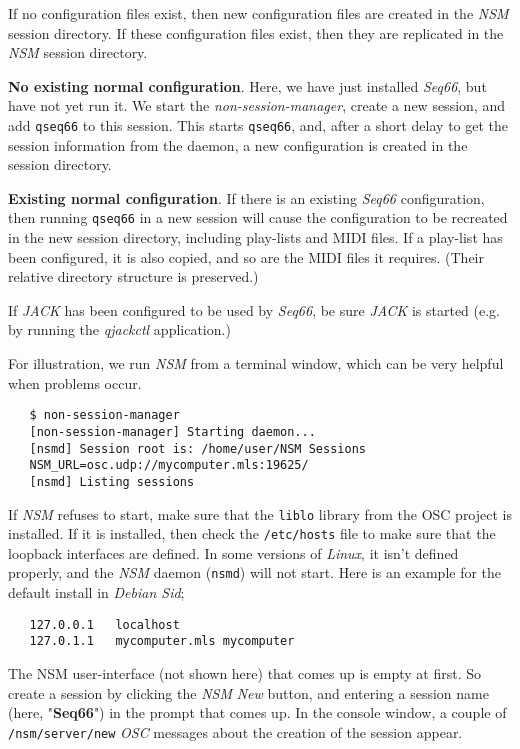    If no configuration files exist, then new configuration files are created
   in the \textsl{NSM} session directory.
   If these configuration files exist, then they are replicated in the
   \textsl{NSM} session directory.

   \textbf{No existing normal configuration}.
   Here, we have just installed \textsl{Seq66}, but have not
   yet run it.  We start the \textsl{non-session-manager}, create a new session,
   and add \texttt{qseq66} to this session.  This starts \texttt{qseq66}, and,
   after a short delay to get the session information from the daemon, a new
   configuration is created in the session directory.

   \textbf{Existing normal configuration}.
   If there is an existing \textsl{Seq66} configuration,
   then running \texttt{qseq66} in a new
   session will cause the configuration to be recreated in the new session
   directory, including play-lists and MIDI files.
   If a play-list has been configured, it is also
   copied, and so are the MIDI files it requires. (Their relative directory
   structure is preserved.)

   If \textsl{JACK} has been configured to be
   used by \textsl{Seq66}, be sure \textsl{JACK} is started (e.g. by running
   the \textsl{qjackctl} application.)

   For illustration, we run \textsl{NSM} from a terminal window, which can be
   very helpful when problems occur.

\begin{verbatim}
   $ non-session-manager
   [non-session-manager] Starting daemon...
   [nsmd] Session root is: /home/user/NSM Sessions
   NSM_URL=osc.udp://mycomputer.mls:19625/
   [nsmd] Listing sessions
\end{verbatim}

   If \textsl{NSM} refuses to start, make sure that the \texttt{liblo} library
   from the OSC project is installed.  If it is installed, then check the
   \texttt{/etc/hosts} file to make sure that the loopback interfaces are
   defined. In some versions of \textsl{Linux}, it isn't defined properly,
   and the \textsl{NSM} daemon (\texttt{nsmd}) will not start.
   Here is an example for the default install in \textsl{Debian Sid};

\begin{verbatim}
   127.0.0.1   localhost
   127.0.1.1   mycomputer.mls mycomputer
\end{verbatim}

   The NSM user-interface (not shown here) that comes up is empty at first.
   So create a session by clicking the \textsl{NSM}
   \textsl{New} button, and entering a session name
   (here, "\textbf{Seq66}") in the
   prompt that comes up.  In the console window, a couple of 
   \texttt{/nsm/server/new} \textsl{OSC} messages
   about the creation of the session appear.

